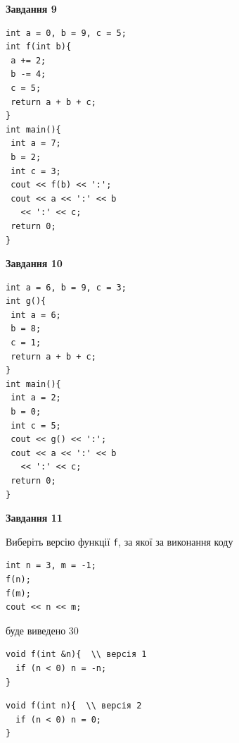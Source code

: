 \documentclass[12pt, ukrainian]{article}
\def\code#1{\Verb!#1!}
\begin{document}
{\begin {large}
\begin{minipage}[t]{11.0cm}
\end{minipage}


\begin{minipage}[t]{7.0cm}

\begin{center}
\textbf{Завдання 9}
\end{center}
\vspace{-8mm}

\begin{verbatim}
int a = 0, b = 9, c = 5;
int f(int b){
 a += 2;
 b -= 4;
 c = 5;
 return a + b + c;
}
int main(){
 int a = 7;
 b = 2;
 int c = 3;
 cout << f(b) << ':';
 cout << a << ':' << b 
   << ':' << c;
 return 0;
}
\end{verbatim}



\begin{center}
\textbf{Завдання 10}
\end{center}
\vspace{-8mm}

\begin{verbatim}
int a = 6, b = 9, c = 3;
int g(){
 int a = 6;
 b = 8;
 c = 1;
 return a + b + c;
}
int main(){
 int a = 2;
 b = 0;
 int c = 5;
 cout << g() << ':';
 cout << a << ':' << b 
   << ':' << c;
 return 0;
}
\end{verbatim}

\end{minipage}
\vline \hspace{1mm}
\begin{minipage}[t]{11.0cm}

\begin{center}
\textbf{Завдання 11}
\end{center}
Виберіть версію функції \code{f}, за якої за виконання коду
\begin{verbatim}
int n = 3, m = -1;
f(n);
f(m);
cout << n << m;
\end{verbatim}

буде виведено 30

\begin{verbatim}
void f(int &n){  \\ версія 1
  if (n < 0) n = -n;
}
\end{verbatim}

\vspace{-8mm}\begin{verbatim}
void f(int n){  \\ версія 2
  if (n < 0) n = 0;
}
\end{verbatim}


\end{minipage}
\end{large}}
\end{document}
